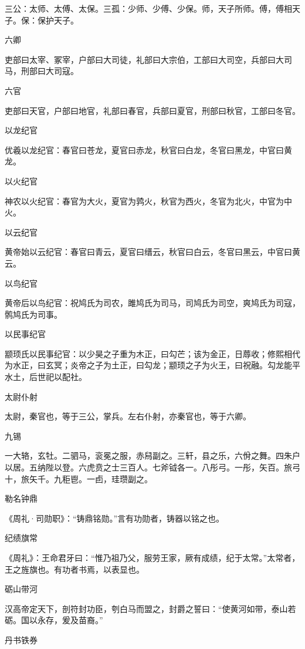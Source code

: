 \documentclass[a4paper,12pt,UTF8,twoside]{ctexbook}
\begin{document}
    三公：太师、太傅、太保。三孤：少师、少傅、少保。师，天子所师。傅，傅相天子。保：保护天子。
    
    六卿
    
    吏部曰太宰、冢宰，户部曰大司徒，礼部曰大宗伯，工部曰大司空，兵部曰大司马，刑部曰大司寇。
    
    六官
    
    吏部曰天官，户部曰地官，礼部曰春官，兵部曰夏官，刑部曰秋官，工部曰冬官。
    
    以龙纪官
    
    优羲以龙纪官：春官曰苍龙，夏官曰赤龙，秋官曰白龙，冬官曰黑龙，中官曰黄龙。
    
    以火纪官
    
    神农以火纪官：春官为大火，夏官为鹑火，秋官为西火，冬官为北火，中官为中火。
    
    以云纪官
    
    黄帝始以云纪官：春官曰青云，夏官曰缙云，秋官曰白云，冬官曰黑云，中官曰黄云。
    
    以鸟纪官
    
    黄帝后以鸟纪官：祝鸠氏为司农，雎鸠氏为司马，司鸠氏为司空，爽鸠氏为司寇，鹘鸠氏为司事。
    
    以民事纪官
    
    颛顼氏以民事纪官：以少昊之子重为木正，曰勾芒；该为金正，日蓐收；修熙相代为水正，曰玄冥；炎帝之子为土正，曰勾龙；颛顼之子为火王，曰祝融。勾龙能平水土，后世祀以配社。
    
    太尉仆射
    
    太尉，秦官也，等于三公，掌兵。左右仆射，亦秦官也，等于六卿。
    
    九锡
    
    一大辂，玄牡。二驷马，衮冕之服，赤舄副之。三轩，县之乐，六佾之舞。四朱户以居。五纳陛以登。六虎贲之士三百人。七斧钺各一。八彤弓。一彤，矢百。旅弓十，旅矢千。九秬鬯。一卣，珪瓒副之。
    
    勒名钟鼎
    
    《周礼·司勋职》：“铸鼎铭勋。”言有功勋者，铸器以铭之也。
    
    纪绩旗常
    
    《周礼》：王命君牙曰：“惟乃祖乃父，服劳王家，厥有成绩，纪于太常。”太常者，王之旌旗也。有功者书焉，以表显也。
    
    砺山带河
    
    汉高帝定天下，剖符封功臣，刳白马而盟之，封爵之誓曰：“使黄河如带，泰山若砺。国以永存，爰及苗裔。”
    
    丹书铁券
    
\end{document}
